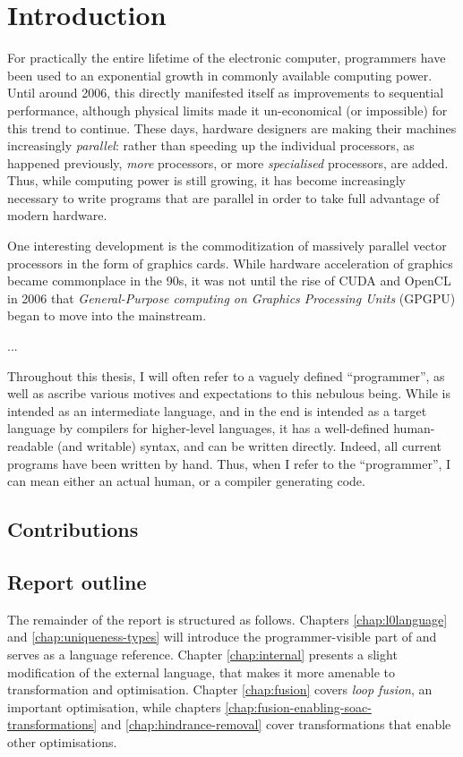 \chapter{Introduction}

For practically the entire lifetime of the electronic computer,
programmers have been used to an exponential growth in commonly
available computing power.  Until around 2006, this directly
manifested itself as improvements to sequential performance, although
physical limits made it un-economical (or impossible) for this trend
to continue.  These days, hardware designers are making their machines
increasingly \textit{parallel}: rather than speeding up the individual
processors, as happened previously, \textit{more} processors, or more
\textit{specialised} processors, are added.  Thus, while computing
power is still growing, it has become increasingly necessary to write
programs that are parallel in order to take full advantage of modern
hardware.

One interesting development is the commoditization of massively
parallel vector processors in the form of graphics cards.  While
hardware acceleration of graphics became commonplace in the 90s, it
was not until the rise of CUDA and OpenCL in 2006 that
\textit{General-Purpose computing on Graphics Processing Units}
(GPGPU) began to move into the mainstream.

... 

Throughout this thesis, I will often refer to a vaguely defined
``programmer'', as well as ascribe various motives and expectations to
this nebulous being.  While \LO{} is intended as an intermediate
language, and in the end is intended as a target language by compilers
for higher-level languages, it has a well-defined human-readable (and
writable) syntax, and can be written directly.  Indeed, all current
\LO{} programs have been written by hand.  Thus, when I refer to the
``programmer'', I can mean either an actual human, or a compiler
generating \LO{} code.

\section{Contributions}


\section{Report outline}

The remainder of the report is structured as follows.  Chapters
\ref{chap:l0language} and \ref{chap:uniqueness-types} will introduce
the programmer-visible part of \LO{} and serves as a language
reference.  Chapter \ref{chap:internal} presents a slight modification
of the external language, that makes it more amenable to
transformation and optimisation.  Chapter \ref{chap:fusion} covers
\textit{loop fusion}, an important optimisation, while chapters
\ref{chap:fusion-enabling-soac-transformations} and
\ref{chap:hindrance-removal} cover transformations that enable other
optimisations.

